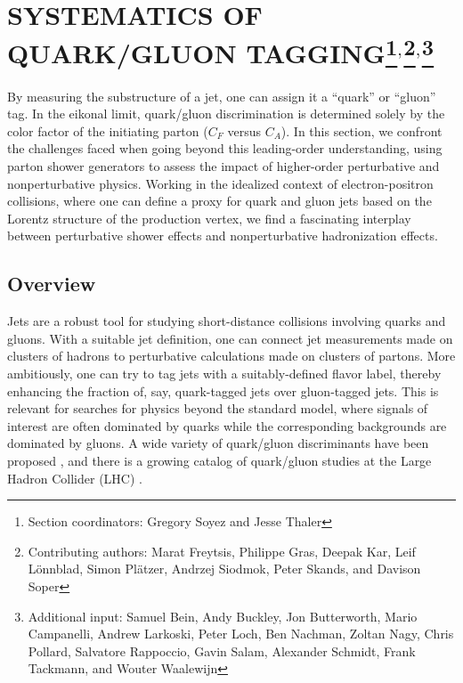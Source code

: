 \documentclass[11pt]{cernrep}
\begin{document}
\section{SYSTEMATICS OF QUARK/GLUON TAGGING\protect\footnote{Section coordinators: Gregory Soyez and Jesse Thaler}$^{,}$\protect\footnote{Contributing authors: Marat Freytsis, Philippe Gras, Deepak Kar, Leif L\"onnblad, Simon Pl\"atzer, Andrzej Siodmok, Peter Skands, and Davison Soper}$^{,}$\protect\footnote{Additional input: Samuel Bein, Andy Buckley, Jon Butterworth, Mario Campanelli, Andrew Larkoski, Peter Loch, Ben Nachman, Zoltan Nagy, Chris Pollard, Salvatore Rappoccio, Gavin Salam, Alexander Schmidt, Frank Tackmann, and Wouter Waalewijn}}

By measuring the substructure of a jet, one can assign it a ``quark'' or ``gluon'' tag.  In the eikonal limit, quark/gluon discrimination is determined solely by the color factor of the initiating parton ($C_F$ versus $C_A$).  In this section, we confront the challenges faced when going beyond this leading-order understanding, using parton shower generators to assess the impact of higher-order perturbative and nonperturbative physics.  Working in the idealized context of electron-positron collisions, where one can define a proxy for quark and gluon jets based on the Lorentz structure of the production vertex, we find a fascinating interplay between perturbative shower effects and nonperturbative hadronization effects.

\subsection{Overview}
\label{quarkgluon_sec:overview}

Jets are a robust tool for studying short-distance collisions involving quarks and gluons.  With a suitable jet definition, one can connect jet measurements made on clusters of hadrons to perturbative calculations made on clusters of partons.  More ambitiously, one can try to tag jets with a suitably-defined flavor label, thereby enhancing the fraction of, say, quark-tagged jets over gluon-tagged jets.  This is relevant for searches for physics beyond the standard model, where signals of interest are often dominated by quarks while the corresponding backgrounds are dominated by gluons.  A wide variety of quark/gluon discriminants have been proposed \cite{Gallicchio:2011xq,Gallicchio:2012ez,Krohn:2012fg,Pandolfi:1480598,Chatrchyan:2012sn,Larkoski:2013eya,Larkoski:2014pca,Bhattacherjee:2015psa}, and there is a growing catalog of quark/gluon studies at the Large Hadron Collider (LHC) \cite{Aad:2014gea,Aad:2014bia,Khachatryan:2014dea,Aad:2015owa,Khachatryan:2015bnx,Aad:2016oit}.
\end{document}

